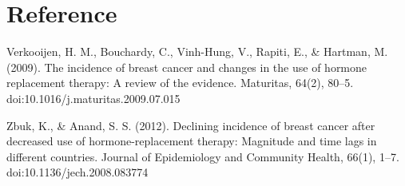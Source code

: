 \documentclass{article}
\begin{document}
\section*{Reference}
\label{reference}

Verkooijen, H. M., Bouchardy, C., Vinh-Hung, V., Rapiti, E., \& Hartman, M. (2009). The incidence of breast cancer and changes in the use of hormone replacement therapy: A review of the evidence. Maturitas, 64(2), 80--5. doi:10.1016\slash j.maturitas.2009.07.015

Zbuk, K., \& Anand, S. S. (2012). Declining incidence of breast cancer after decreased use of hormone-replacement therapy: Magnitude and time lags in different countries. Journal of Epidemiology and Community Health, 66(1), 1--7. doi:10.1136\slash jech.2008.083774
\end{document}
